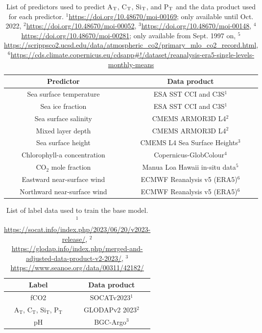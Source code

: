 \documentclass{article}
\begin{document}
	\begin{table}
		\centering
		\bgroup
		\def\arraystretch{1.5}
		\begin{tabular}{c|c}
			Predictor & Data product \\ \hline
			Sea surface temperature & ESA SST CCI and C3S$^1$  \\
			Sea ice fraction & ESA SST CCI and C3S$^1$  \\
			Sea surface salinity & CMEMS ARMOR3D L4$^2$ \\
			Mixed layer depth & CMEMS ARMOR3D L4$^2$ \\
			Sea surface height & CMEMS L4 Sea Surface Heights$^3$ \\
			Chlorophyll-a concentration & Copernicus-GlobColour$^4$ \\
			CO$_2$ mole fraction & Manua Loa Hawaii in-situ data$^5$ \\ %
			Eastward near-surface wind & ECMWF Reanalysis v5 (ERA5)$^6$ \\
			Northward near-surface wind & ECMWF Reanalysis v5 (ERA5)$^6$
		\end{tabular}
		\egroup
		\caption{List of predictors used to predict A$_\textup{T}$, C$_\textup{T}$, Si$_\textup{T}$, and P$_\textup{T}$ and the data product used for each predictor. $^1$\url{https://doi.org/10.48670/moi-00169}; only available until Oct. 2022, $^2$\url{https://doi.org/10.48670/moi-00052}, $^3$\url{https://doi.org/10.48670/moi-00148},
			$^4$\url{https://doi.org/10.48670/moi-00281}; only available from Sept. 1997 on, $^5$\url{https://scrippsco2.ucsd.edu/data/atmospheric_co2/primary_mlo_co2_record.html}, 
			$^6$\url{https://cds.climate.copernicus.eu/cdsapp\#!/dataset/reanalysis-era5-single-levels-monthly-means}}
		\label{tab:pred_data}
	\end{table}
	
	\begin{table}
		\centering
		\bgroup
		\def\arraystretch{1.5}
		\begin{tabular}{c|c}
			Label & Data product \\ \hline
			fCO2 & SOCATv2023$^1$ \\
			A$_\text{T}$, C$_\text{T}$, Si$_\text{T}$, P$_\text{T}$ & GLODAPv2 2023$^2$ \\
			pH & BGC-Argo$^3$
		\end{tabular}
		\egroup
		\caption{List of label data used to train the base model. $^1$\url{https://socat.info/index.php/2023/06/20/v2023-release/}, $^2$\url{https://glodap.info/index.php/merged-and-adjusted-data-product-v2-2023/}, $^3$\url{https://www.seanoe.org/data/00311/42182/}}
		\label{tab:label_data}
	\end{table}
	
\end{document}
